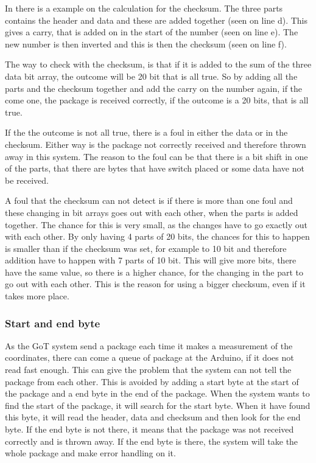 In  there is a example on the calculation for the checksum. The three parts contains the header and data and these are added together (seen on line d). This gives a carry, that is added on in the start of the number (seen on line e). The new number is then inverted and this is then the checksum (seen on line f).

The way to check with the checksum, is that if it is added to the sum of the three data bit array, the outcome will be 20 bit that is all true. So by adding all the parts and the checksum together and add the carry on the number again, if the come one, the package is received correctly, if the outcome is a 20 bits, that is all true.

If the the outcome is not all true, there is a foul in either the data or in the checksum. Either way is the package not correctly received and therefore thrown away in this system. The reason to the foul can be that there is a bit shift in one of the parts, that there are bytes that have switch placed or some data have not be received. 

A foul that the checksum can not detect is if there is more than one foul and these changing in bit arrays goes out with each other, when the parts is added together. The chance for this is very small, as the changes have to go exactly out with each other. By only having 4 parts of 20 bits, the chances for this to happen is smaller than if the checksum was set, for example to 10 bit and therefore addition have to happen with 7 parts of 10 bit. This will give more bits, there have the same value, so there is a higher chance, for the changing in the part to go out with each other. This is the reason for using a bigger checksum, even if it takes more place.

\subsubsection{Start and end byte}
As the GoT system send a package each time it makes a measurement of the coordinates, there can come a queue of package at the Arduino, if it does not read fast enough. This can give the problem that the system can not tell the package from each other. This is avoided by adding a start byte at the start of the package and a end byte in the end of the package. When the system wants to find the start of the package, it will search for the start byte. When it have found this byte, it will read the header, data and checksum and then look for the end byte. If the end byte is not there, it means that the package was not received correctly and is thrown away. If the end byte is there, the system will take the whole package and make error handling on it.

